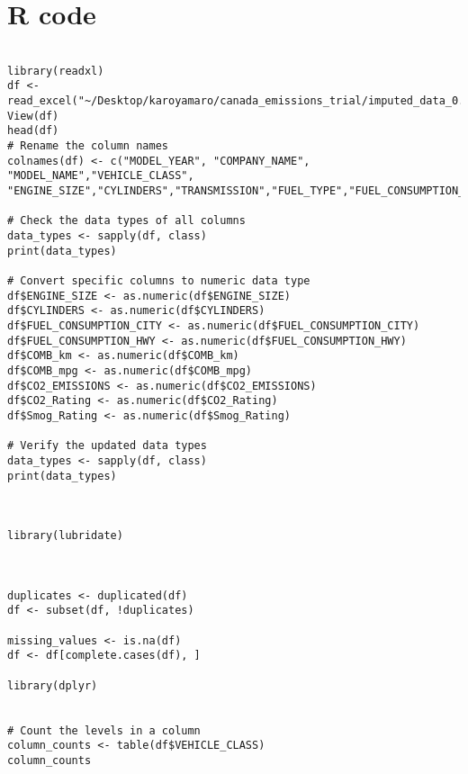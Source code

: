 \documentclass[12pt, a4paper,oneside]{book}
\numberwithin{equation}{section}
\begin{document}
    \chapter{R code}
\begin{lstlisting}

library(readxl)
df <- read_excel("~/Desktop/karoyamaro/canada_emissions_trial/imputed_data_0.xlsx")
View(df)
head(df)
# Rename the column names
colnames(df) <- c("MODEL_YEAR", "COMPANY_NAME", "MODEL_NAME","VEHICLE_CLASS", "ENGINE_SIZE","CYLINDERS","TRANSMISSION","FUEL_TYPE","FUEL_CONSUMPTION_CITY","FUEL_CONSUMPTION_HWY","COMB_km","COMB_mpg","CO2_EMISSIONS","CO2_Rating","Smog_Rating")

# Check the data types of all columns
data_types <- sapply(df, class)
print(data_types)

# Convert specific columns to numeric data type
df$ENGINE_SIZE <- as.numeric(df$ENGINE_SIZE)
df$CYLINDERS <- as.numeric(df$CYLINDERS)
df$FUEL_CONSUMPTION_CITY <- as.numeric(df$FUEL_CONSUMPTION_CITY)
df$FUEL_CONSUMPTION_HWY <- as.numeric(df$FUEL_CONSUMPTION_HWY)
df$COMB_km <- as.numeric(df$COMB_km)
df$COMB_mpg <- as.numeric(df$COMB_mpg)
df$CO2_EMISSIONS <- as.numeric(df$CO2_EMISSIONS)
df$CO2_Rating <- as.numeric(df$CO2_Rating)
df$Smog_Rating <- as.numeric(df$Smog_Rating)

# Verify the updated data types
data_types <- sapply(df, class)
print(data_types)



library(lubridate)



duplicates <- duplicated(df)
df <- subset(df, !duplicates)

missing_values <- is.na(df)
df <- df[complete.cases(df), ]

library(dplyr)


# Count the levels in a column
column_counts <- table(df$VEHICLE_CLASS)
column_counts


\end{lstlisting}
\end{document}
